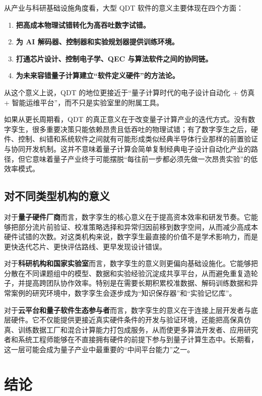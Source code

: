 \documentclass[11pt,a4paper]{article}
\newcommand{\QDT}{QDT}
\newcommand{\QEC}{QEC}
\begin{document}
从产业与科研基础设施角度看，大型 \QDT{} 软件的意义主要体现在四个方面：

\begin{enumerate}
  \item \textbf{把高成本物理试错转化为高吞吐数字试错。}
  \item \textbf{为 AI 解码器、控制器和实验规划器提供训练环境。}
  \item \textbf{打通芯片设计、控制电子学、\QEC{} 与算法软件之间的协同链。}
  \item \textbf{为未来容错量子计算建立“软件定义硬件”的方法论。}
\end{enumerate}

从这个意义上说，\QDT{} 的地位更接近于“量子计算时代的电子设计自动化 + 仿真 + 智能运维平台”，而不只是实验室里的附属工具。

如果从更长周期看，\QDT{} 的真正意义在于改变量子计算产业的迭代方式。没有数字孪生，很多重要决策只能依赖昂贵且低吞吐的物理试错；有了数字孪生之后，硬件、控制、纠错和系统软件之间就有可能形成类似经典半导体行业那样的前置验证与协同开发机制。这并不意味着量子计算会简单复制经典电子设计自动化产业的路径，但它意味着量子产业终于可能摆脱“每往前一步都必须先做一次昂贵实验”的低效率模式。

\subsection{对不同类型机构的意义}

对于\textbf{量子硬件厂商}而言，数字孪生的核心意义在于提高资本效率和研发节奏。它能够把部分流片前验证、校准策略选择和异常归因前移到数字空间，从而减少高成本硬件试错的次数。对这类机构来说，数字孪生最直接的价值不是学术影响力，而是更快迭代芯片、更快评估路线、更早发现设计错误。

对于\textbf{科研机构和国家实验室}而言，数字孪生的意义则更偏向基础设施化。它能够把分散在不同课题组中的模型、数据和实验经验沉淀成共享平台，从而避免重复造轮子，并提高跨团队协作效率。特别是在需要长期积累校准数据、解码训练数据和异常案例的研究环境中，数字孪生会逐步成为“知识保存器”和“实验记忆库”。

对于\textbf{云平台和量子软件生态参与者}而言，数字孪生的意义在于连接上层开发者与底层硬件。它不仅能提供更接近真实硬件条件的开发与验证环境，还能把高保真仿真、训练数据工厂和混合计算能力打包成服务，从而使更多算法开发者、应用研究者和系统工程师能够在不直接拥有硬件的前提下参与到量子计算生态中。长期看，这一层可能会成为量子产业中最重要的“中间平台能力”之一。

\section{结论}
\end{document}
